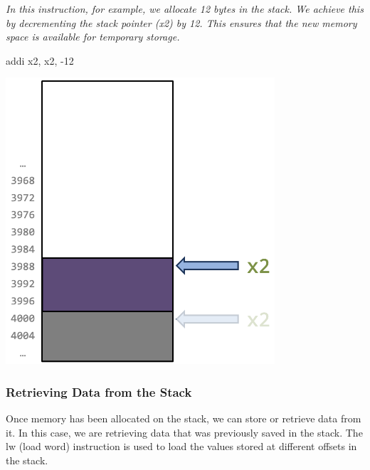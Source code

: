 \begin{minipage}[htp]{0.4\textwidth}
\textit{In this instruction, for example, we allocate 12 bytes in the stack. We achieve this by decrementing the stack pointer (x2) by 12. This ensures that the new memory space is available for temporary storage.}
\begin{assembly}
addi x2, x2, -12
\end{assembly}
\end{minipage}
\hfill
\vline
\hfill
\begin{minipage}[htp]{0.4\textwidth}
\begin{center}
\includegraphics[width=0.75\textwidth]{chapters/chapter1b/images/stack2.png}
\end{center}
\end{minipage}

\subsubsection{Retrieving Data from the Stack}
Once memory has been allocated on the stack, we can store or retrieve data from it. In this case, we are retrieving data that was previously saved in the stack. The lw (load word) instruction is used to load the values stored at different offsets in the stack.

